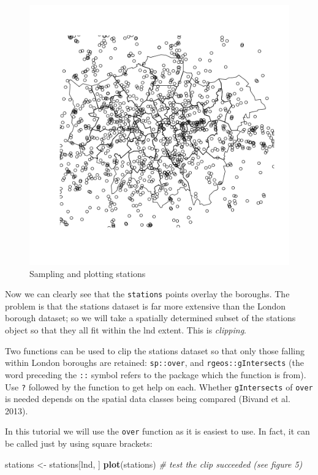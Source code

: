 \documentclass[]{article}
\newenvironment{Shaded}{}{}
\newcommand{\KeywordTok}[1]{\textcolor[rgb]{0.00,0.44,0.13}{\textbf{{#1}}}}
\newcommand{\StringTok}[1]{\textcolor[rgb]{0.25,0.44,0.63}{{#1}}}
\newcommand{\CommentTok}[1]{\textcolor[rgb]{0.38,0.63,0.69}{\textit{{#1}}}}
\newcommand{\NormalTok}[1]{{#1}}
\begin{document}
\begin{figure}[htbp]
\centering
\includegraphics{figure/Sampling_and_plotting_stations.png}
\caption{Sampling and plotting stations}
\end{figure}

Now we can clearly see that the \texttt{stations} points overlay the
boroughs. The problem is that the stations dataset is far more extensive
than the London borough dataset; so we will take a spatially determined
subset of the stations object so that they all fit within the lnd
extent. This is \emph{clipping}.

Two functions can be used to clip the stations dataset so that only
those falling within London boroughs are retained: \texttt{sp::over},
and \texttt{rgeos::gIntersects} (the word preceding the \texttt{::}
symbol refers to the package which the function is from). Use \texttt{?}
followed by the function to get help on each. Whether
\texttt{gIntersects} of \texttt{over} is needed depends on the spatial
data classes being compared (Bivand et al. 2013).

In this tutorial we will use the \texttt{over} function as it is easiest
to use. In fact, it can be called just by using square brackets:

\begin{Shaded}
\begin{Highlighting}[]
\NormalTok{stations <-}\StringTok{ }\NormalTok{stations[lnd, ]}
\KeywordTok{plot}\NormalTok{(stations)  }\CommentTok{# test the clip succeeded (see figure 5)}
\end{Highlighting}
\end{Shaded}
\end{document}
